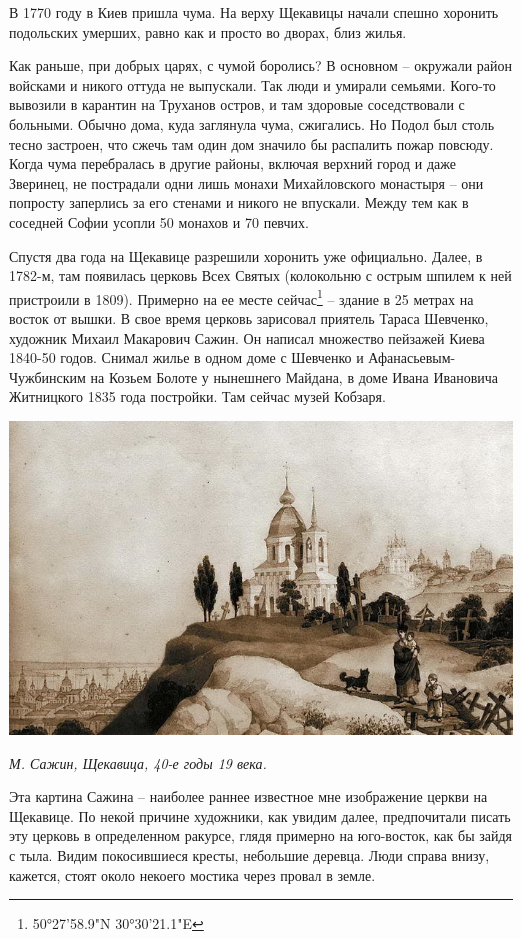 В 1770 году в Киев пришла чума. На верху Щекавицы начали спешно хоронить подольских умерших, равно как и просто во дворах, близ жилья.

Как раньше, при добрых царях, с чумой боролись? В основном – окружали район войсками и никого оттуда не выпускали. Так люди и умирали семьями. Кого-то вывозили в карантин на Труханов остров, и там здоровые соседствовали с больными. Обычно дома, куда заглянула чума, сжигались. Но Подол был столь тесно застроен, что сжечь там один дом значило бы распалить пожар повсюду. Когда чума перебралась в другие районы, включая верхний город и даже Зверинец, не пострадали одни лишь монахи Михайловского монастыря – они попросту заперлись за его стенами и никого не впускали. Между тем как в соседней Софии усопли 50 монахов и 70 певчих.

Спустя два года на Щекавице разрешили хоронить уже официально. Далее, в 1782-м, там появилась церковь Всех Святых (колокольню с острым шпилем к ней пристроили в 1809). Примерно на ее месте сейчас\footnote{50°27'58.9"N 30°30'21.1"E} – здание в 25 метрах на восток от вышки. В свое время церковь зарисовал приятель Тараса Шевченко, художник Михаил Макарович Сажин. Он написал множество пейзажей Киева 1840-50 годов. Снимал жилье в одном доме с Шевченко и Афанасьевым-Чужбинским на Козьем Болоте у нынешнего Майдана, в доме Ивана Ивановича Житницкого 1835 года постройки. Там сейчас музей Кобзаря.

\begin{center}
\includegraphics[width=\textwidth]{chast-colebanie-osnov/sheka/shekavica-sajin.jpg}

\textit{М. Сажин, Щекавица, 40-е годы 19 века.}
\end{center}

Эта картина Сажина – наиболее раннее известное мне изображение церкви на Щекавице. По некой причине художники, как увидим далее, предпочитали писать эту церковь в определенном ракурсе, глядя примерно на юго-восток, как бы зайдя с тыла. Видим покосившиеся кресты, небольшие деревца. Люди справа внизу, кажется, стоят около некоего мостика через провал в земле. 

